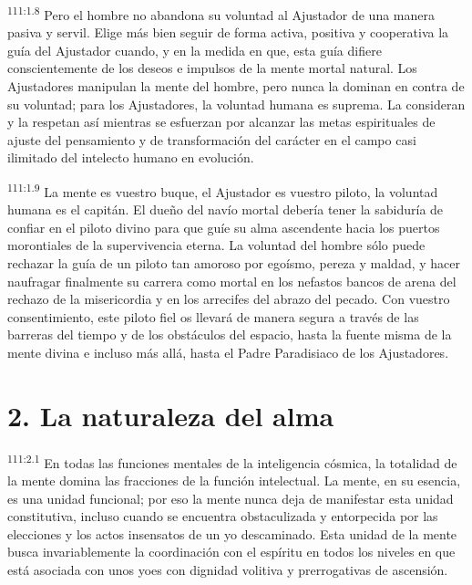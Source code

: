 \par
\textsuperscript{111:1.8} Pero el hombre no abandona su voluntad al Ajustador de una manera pasiva y servil. Elige más bien seguir de forma activa, positiva y cooperativa la guía del Ajustador cuando, y en la medida en que, esta guía difiere conscientemente de los deseos e impulsos de la mente mortal natural. Los Ajustadores manipulan la mente del hombre, pero nunca la dominan en contra de su voluntad; para los Ajustadores, la voluntad humana es suprema. La consideran y la respetan así mientras se esfuerzan por alcanzar las metas espirituales de ajuste del pensamiento y de transformación del carácter en el campo casi ilimitado del intelecto humano en evolución.

\par
\textsuperscript{111:1.9} La mente es vuestro buque, el Ajustador es vuestro piloto, la voluntad humana es el capitán. El dueño del navío mortal debería tener la sabiduría de confiar en el piloto divino para que guíe su alma ascendente hacia los puertos morontiales de la supervivencia eterna. La voluntad del hombre sólo puede rechazar la guía de un piloto tan amoroso por egoísmo, pereza y maldad, y hacer naufragar finalmente su carrera como mortal en los nefastos bancos de arena del rechazo de la misericordia y en los arrecifes del abrazo del pecado. Con vuestro consentimiento, este piloto fiel os llevará de manera segura a través de las barreras del tiempo y de los obstáculos del espacio, hasta la fuente misma de la mente divina e incluso más allá, hasta el Padre Paradisiaco de los Ajustadores.

\section*{2. La naturaleza del alma}
\par
\textsuperscript{111:2.1} En todas las funciones mentales de la inteligencia cósmica, la totalidad de la mente domina las fracciones de la función intelectual. La mente, en su esencia, es una unidad funcional; por eso la mente nunca deja de manifestar esta unidad constitutiva, incluso cuando se encuentra obstaculizada y entorpecida por las elecciones y los actos insensatos de un yo descaminado. Esta unidad de la mente busca invariablemente la coordinación con el espíritu en todos los niveles en que está asociada con unos yoes con dignidad volitiva y prerrogativas de ascensión.

